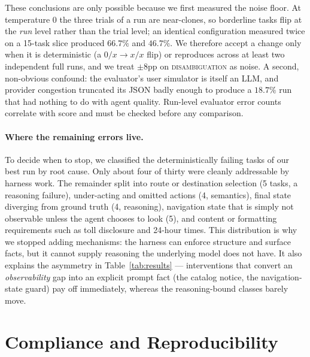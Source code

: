 \documentclass{article}
\begin{document}
These conclusions are only possible because we first measured the noise
floor. At temperature $0$ the three trials of a run are near-clones, so
borderline tasks flip at the \emph{run} level rather than the trial
level; an identical configuration measured twice on a 15-task slice
produced $66.7\%$ and $46.7\%$. We therefore accept a change only when it
is deterministic (a $0/x \rightarrow x/x$ flip) or reproduces across at
least two independent full runs, and we treat $\pm 8$pp on
\textsc{disambiguation} as noise. A second, non-obvious confound: the
evaluator's user simulator is itself an LLM, and provider congestion
truncated its JSON badly enough to produce a $18.7\%$ run that had
nothing to do with agent quality. Run-level evaluator error counts
correlate with score and must be checked before any comparison.

\paragraph{Where the remaining errors live.}
To decide when to stop, we classified the deterministically failing
tasks of our best run by root cause. Only about four of thirty were
cleanly addressable by harness work. The remainder split into
route or destination selection (5 tasks, a reasoning failure),
under-acting and omitted actions (4, semantics), final state diverging
from ground truth (4, reasoning), navigation state that is simply not
observable unless the agent chooses to look (5), and content or
formatting requirements such as toll disclosure and 24-hour times.
This distribution is why we stopped adding mechanisms: the harness can
enforce structure and surface facts, but it cannot supply reasoning the
underlying model does not have. It also explains the asymmetry in
Table~\ref{tab:results} --- interventions that convert an
\emph{observability} gap into an explicit prompt fact (the catalog
notice, the navigation-state guard) pay off immediately, whereas the
reasoning-bound classes barely move.

\section{Compliance and Reproducibility}
\end{document}
